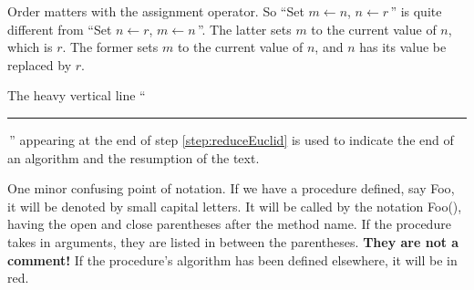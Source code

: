 Order matters with the assignment operator. So ``Set $m\gets n$,
$n\gets r\,$'' is quite different from ``Set $n\gets r$, $m\gets
n\,$''. The latter sets $m$ to the current value of $n$, which is
$r$. The former sets $m$ to the current value of $n$, and $n$ has
its value be replaced by $r$.

%
The heavy vertical line ``\,\rule[-2pt]{3pt}{8pt}\,'' appearing at the end of
step \ref{step:reduceEuclid} is
used to indicate the end of an algorithm and the resumption of
the text.

One minor confusing point of notation. If we have a procedure
defined, say {\sc Foo}, it will be denoted by small capital
letters. It will be called by the notation {\sc Foo()}, having
the open and close parentheses after the method name. If the
procedure takes in arguments, they are listed in between the
parentheses. \textbf{They are not a comment!} If the procedure's
algorithm has been defined elsewhere, it will be in red.
